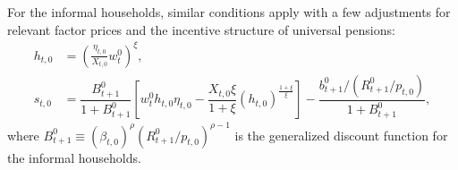 For the informal households, similar conditions apply with a few adjustments for relevant factor prices and the incentive structure of universal pensions:
\begin{subequations}\label{\refeq:informalOpt}
\begin{align}
    h_{t,0} &= \left(\frac{\eta_{t,0}}{X_{t,0}}w_t^0\right)^{\xi},\\
    s_{t,0} &=  \dfrac{B_{t+1}^0}{1+B_{t+1}^0}\left[w_t^0h_{t,0}\eta_{t,0}-\dfrac{X_{t,0}\xi}{1+\xi}\left(h_{t,0}\right)^{\frac{1+\xi}{\xi}}\right]-\dfrac{b_{t+1}^0/(R_{t+1}^0/p_{t,0})}{1+B_{t+1}^0},
\end{align}
\end{subequations}
where $B_{t+1}^0 \equiv \left(\beta_{t,0}\right)^{\rho} \left(R_{t+1}^0/p_{t,0}\right)^{\rho-1}$ is the generalized discount function for the informal households.


